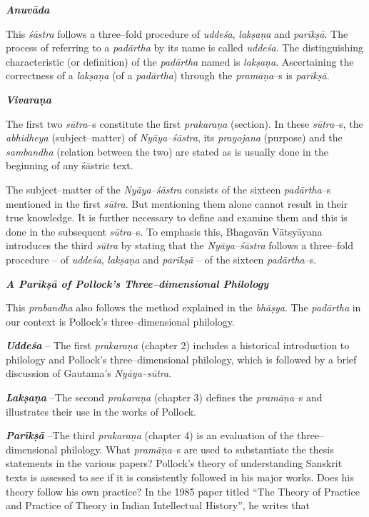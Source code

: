 \textit{\textbf{Anuvāda}}

This \textit{śāstra} follows a three–fold procedure of \textit{uddeśa}, \textit{lakṣaṇa} and \textit{parīkṣā}. The process of referring to a \textit{padārtha} by its name is called \textit{uddeśa}. The distinguishing characteristic (or definition) of the \textit{padārtha} named is\textit{ lakṣaṇa}. Ascertaining the correctness of a \textit{lakṣaṇa} (of a \textit{padārtha}) through the \textit{pramāṇa}–s is \textit{parīkṣā}.

\textit{\textbf{Vivaraṇa}}

The first two \textit{sūtra}–s constitute the first \textit{prakaraṇa} (section). In these \textit{sūtra}–s, the \textit{abhidheya} (subject–matter) of \textit{Nyāya–śāstra}, its \textit{prayojana} (purpose) and the \textit{sambandha} (relation between the two) are stated as is usually done in the beginning of any śāstric text.

The subject–matter of the \textit{Nyāya–śāstra} consists of the sixteen \textit{padārtha}–s mentioned in the first \textit{sūtra}. But mentioning them alone cannot result in their true knowledge. It is further necessary to define and examine them and this is done in the subsequent \textit{sūtra}–s. To emphasis this, Bhagavān Vātsyāyana introduces the third \textit{sūtra} by stating that the \textit{Nyāya–śāstra} follows a three–fold procedure – of \textit{uddeśa}, \textit{lakṣaṇa} and \textit{parīkṣā} – of the sixteen \textit{padārtha}–s.

\textbf{\textit{A Parīkṣā of Pollock’s Three–dimensional Philology}}

This \textit{prabandha} also follows the method explained in the \textit{bhāṣya}. The \textit{padārtha} in our context is Pollock’s three–dimensional philology.

\textit{\textbf{Uddeśa }} – The first \textit{prakaraṇa} (chapter 2) includes a historical introduction to philology and Pollock’s three–dimensional philology, which is followed by a brief discussion of Gautama’s \textit{Nyāya–sūtra}.

\newpage

\textit{\textbf{Lakṣaṇa }} –The second \textit{prakaraṇa} (chapter 3) defines the \textit{pramāṇa}–s and illustrates their use in the works of Pollock.

\textit{\textbf{Parīkṣā }} –The third \textit{prakaraṇa} (chapter 4) is an evaluation of the three–dimensional philology. What \textit{pramāṇa}–s are used to substantiate the thesis statements in the various papers? Pollock’s theory of understanding Sanskrit texts is assessed to see if it is consistently followed in his major works. Does his theory follow his own practice? In the 1985 paper titled “The Theory of Practice and Practice of Theory in Indian Intellectual History”, he writes that

